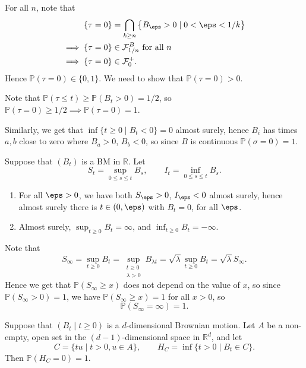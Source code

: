 \documentclass[12pt]{article}
\begin{document}
\begin{proofbox}
	For all $n$, note that
	\begin{align*}
		\{\tau = 0\} &= \bigcap_{k \geq n} \left\{ B_\eps > 0 \mid 0 < \eps < 1/k\right\} \\
		\implies \{\tau = 0\} & \in \mathcal{F}_{1/n}^B \text{ for all } n \\
		\implies \{\tau = 0\} &\in \mathcal{F}_0^+.
	\end{align*}
	Hence $\mathbb{P}(\tau = 0) \in \{0, 1\}$. We need to show that $\mathbb{P}(\tau = 0) > 0$.

	Note that $\mathbb{P}(\tau \leq t) \geq \mathbb{P}(B_t > 0) = 1/2$, so $\mathbb{P}(\tau = 0) \geq 1/2 \implies \mathbb{P}(\tau = 0) = 1$.

	Similarly, we get that $\inf\{ t \geq 0 \mid B_t < 0\} = 0$ almost surely, hence $B_i$ has times $a, b$ close to zero where $B_a > 0$, $B_b < 0$, so since $B$ is continuous $\mathbb{P}(\sigma = 0) = 1$.
\end{proofbox}

\begin{proposition}
	Suppose that $(B_t)$ is a BM in $\mathbb{R}$. Let
	\[
	S_t = \sup_{0 \leq s \leq t} B_s, \qquad I_t = \inf_{0 \leq s \leq t} B_s.
	\]
	\begin{enumerate}[\normalfont(i)]
		\item For all $\eps > 0$, we have both $S_\eps > 0$, $I_\eps < 0$ almost surely, hence almost surely there is $t \in (0, \eps)$ with $B_t = 0$, for all $\eps$.
		\item Almost surely, $\sup_{t \geq 0} B_t = \infty$, and $\inf_{t \geq 0} B_t = -\infty$.
	\end{enumerate}
\end{proposition}

\begin{proofbox}
	Note that
	\[
		S_\infty = \sup_{t \geq 0} B_t = \sup_{\substack{t \geq 0 \\ \lambda > 0}} B_{\lambda t} = \sqrt{\lambda} \sup_{t \geq 0} B_t = \sqrt{ \lambda} S_\infty.
	\]
	Hence we get that $\mathbb{P}(S_\infty \geq x)$ does not depend on the value of $x$, so since $\mathbb{P}(S_\infty > 0) = 1$, we have $\mathbb{P}(S_\infty \geq x) = 1$ for all $x > 0$, so
	\[
	\mathbb{P}(S_\infty = \infty) = 1.
	\]
\end{proofbox}

\begin{proposition}
	Suppose that $(B_t \mid t \geq 0)$ is a $d$-dimensional Brownian motion. Let $A$ be a non-empty, open set in the $(d-1)$-dimensional space in $\mathbb{R}^d$, and let
	\[
		C = \{t u \mid t > 0, u \in A\}, \qquad H_C = \inf\{t > 0 \mid B_t \in C\}.
	\]
	Then $\mathbb{P}(H_C = 0) = 1$.
\end{proposition}
\end{document}
